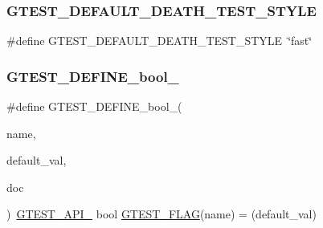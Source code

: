 \subsubsection{\texorpdfstring{GTEST\_DEFAULT\_DEATH\_TEST\_STYLE}{GTEST\_DEFAULT\_DEATH\_TEST\_STYLE}}
{\footnotesize\ttfamily \#define G\+T\+E\+S\+T\+\_\+\+D\+E\+F\+A\+U\+L\+T\+\_\+\+D\+E\+A\+T\+H\+\_\+\+T\+E\+S\+T\+\_\+\+S\+T\+Y\+LE~\char`\"{}fast\char`\"{}}

\mbox{\label{_obj__test_2lib_2googletest-master_2googletest_2include_2gtest_2internal_2gtest-port_8h_a48e05814779e5a2f432b06a12618a760}} 
\subsubsection{\texorpdfstring{GTEST\_DEFINE\_bool\_}{GTEST\_DEFINE\_bool\_}}
{\footnotesize\ttfamily \#define G\+T\+E\+S\+T\+\_\+\+D\+E\+F\+I\+N\+E\+\_\+bool\+\_\+(\begin{DoxyParamCaption}\item[{}]{name,  }\item[{}]{default\+\_\+val,  }\item[{}]{doc }\end{DoxyParamCaption})~\mbox{\hyperlink{_obj__test_2lib_2googletest-release-1_88_81_2googletest_2include_2gtest_2internal_2gtest-port_8h_aa73be6f0ba4a7456180a94904ce17790}{G\+T\+E\+S\+T\+\_\+\+A\+P\+I\+\_\+}} bool \mbox{\hyperlink{_obj__test_2lib_2googletest-release-1_88_81_2googletest_2include_2gtest_2internal_2gtest-port_8h_a828f4e34a1c4b510da50ec1563e3562a}{G\+T\+E\+S\+T\+\_\+\+F\+L\+AG}}(name) = (default\+\_\+val)}

\mbox{\label{_obj__test_2lib_2googletest-master_2googletest_2include_2gtest_2internal_2gtest-port_8h_a88ee2f19589ffff86ca742fd33611358}} 
